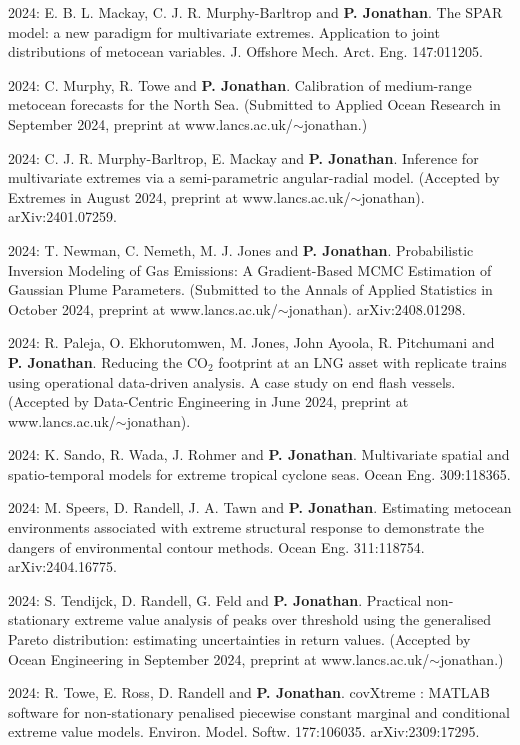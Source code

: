 \documentclass[11pt,a4paper]{moderncv}
\begin{document}
2024: E. B. L. Mackay, C. J. R. Murphy-Barltrop and \textbf{P. Jonathan}. The SPAR model: a new paradigm for multivariate extremes. Application to joint distributions of metocean variables. J. Offshore Mech. Arct. Eng. 147:011205.

2024: C. Murphy, R. Towe and \textbf{P. Jonathan}. Calibration of medium-range metocean forecasts for the North Sea. (Submitted to Applied Ocean Research in September 2024, preprint at www.lancs.ac.uk/$\sim$jonathan.)

2024: C. J. R. Murphy-Barltrop, E. Mackay and \textbf{P. Jonathan}. Inference for multivariate extremes via a semi-parametric angular-radial model. (Accepted by Extremes in August 2024, preprint at www.lancs.ac.uk/$\sim$jonathan).  arXiv:2401.07259.

2024: T. Newman, C. Nemeth, M. J. Jones and \textbf{P. Jonathan}. Probabilistic Inversion Modeling of Gas Emissions: A Gradient-Based MCMC Estimation of Gaussian Plume Parameters. (Submitted to the Annals of Applied Statistics in October 2024, preprint at www.lancs.ac.uk/$\sim$jonathan). arXiv:2408.01298.

2024: R. Paleja, O. Ekhorutomwen, M. Jones, John Ayoola, R. Pitchumani and \textbf{P. Jonathan}. Reducing the CO$_2$ footprint at an LNG asset with replicate trains using operational data-driven analysis. A case study on end flash vessels. (Accepted by Data-Centric Engineering in June 2024, preprint at www.lancs.ac.uk/$\sim$jonathan).

2024: K. Sando, R. Wada, J. Rohmer and \textbf{P. Jonathan}. Multivariate spatial and spatio-temporal models for extreme tropical cyclone seas. Ocean Eng. 309:118365. 

2024: M. Speers, D. Randell, J. A. Tawn and \textbf{P. Jonathan}. Estimating metocean environments associated with extreme structural response to demonstrate the dangers of environmental contour methods. Ocean Eng. 311:118754. arXiv:2404.16775.

2024: S. Tendijck, D. Randell, G. Feld and \textbf{P. Jonathan}. Practical non-stationary extreme value analysis of peaks over threshold using the generalised Pareto distribution: estimating uncertainties in return values. (Accepted by Ocean Engineering in September 2024, preprint at www.lancs.ac.uk/$\sim$jonathan.)

2024: R. Towe, E. Ross, D. Randell and \textbf{P. Jonathan}. covXtreme : MATLAB software for non-stationary penalised piecewise constant marginal and conditional extreme value models. Environ. Model. Softw. 177:106035. arXiv:2309:17295.
\end{document}
